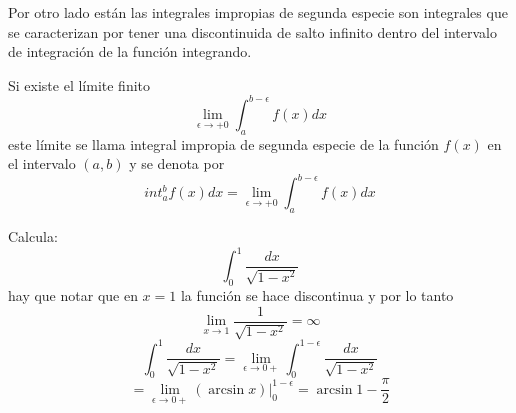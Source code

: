 \documentclass[10pt,twoside]{SelfArx} %
\begin{document}
Por otro lado están las integrales impropias de segunda especie son integrales que se caracterizan por tener una discontinuida de salto infinito dentro del intervalo de integración de la función integrando.
\begin{thm}
	Si existe el límite finito
	\[ 
	\lim\limits_{\epsilon\rightarrow+0}\int_{a}^{b-\epsilon}f(x)dx
	 \]
	 este límite se llama integral impropia de segunda especie de la función $ f(x) $ en el intervalo $ (a,b) $ y se denota por
	 \begin{equation}
	int_{a}^{b}f(x)dx=\lim\limits_{\epsilon\rightarrow+0}\int_{a}^{b-\epsilon}f(x)dx
	 \end{equation}
\end{thm}
\begin{ejemplo}
	Calcula:
	\[ \int_{0}^{1}\dfrac{dx}{\sqrt{1-x^{2}}} \]
	hay que notar que en $ x=1 $ la función se hace discontinua y por lo tanto 
	\[  \lim\limits_{x\rightarrow1}\dfrac{1}{\sqrt{1-x^{2}}}=\infty \]
	\begin{equation}
	\int_{0}^{1}\dfrac{dx}{\sqrt{1-x^{2}}}= \lim\limits_{\epsilon\rightarrow0+}\int_{0}^{1-\epsilon}\dfrac{dx}{\sqrt{1-x^{2}}}
	\end{equation}
	\begin{equation}
	=\lim\limits_{\epsilon\rightarrow0+}(\arcsin x)\biggl|_{0}^{1-\epsilon}=\arcsin1-\dfrac{\pi}{2}
	\end{equation}
\end{ejemplo}
\end{document}
